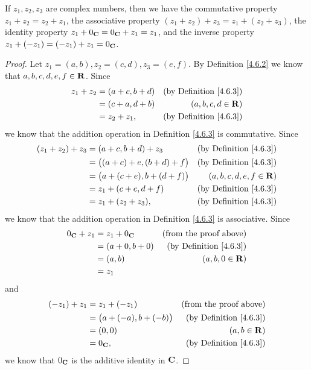 \begin{lemma}\label{4.6.4}
    If \(z_1, z_2, z_3\) are complex numbers, then we have the commutative property \(z_1 + z_2 = z_2 + z_1\), the associative property \((z_1 + z_2) + z_3 = z_1 + (z_2 + z_3)\), the identity property \(z_1 + 0_{\mathbf{C}} = 0_{\mathbf{C}} + z_1 = z_1\), and the inverse property \(z_1 + (-z_1) = (-z_1) + z_1 = 0_{\mathbf{C}}\).
\end{lemma}

\begin{proof}
    Let \(z_1 = (a, b), z_2 = (c, d), z_3 = (e, f)\).
    By Definition \ref{4.6.2} we know that \(a, b, c, d, e, f \in \mathbf{R}\).
    Since
    \begin{align*}
        z_1 + z_2 & = (a + c, b + d) & \text{(by Definition \ref{4.6.3})} \\
                  & = (c + a, d + b) & (a, b, c, d \in \mathbf{R})                \\
                  & = z_2 + z_1,     & \text{(by Definition \ref{4.6.3})}
    \end{align*}
    we know that the addition operation in Definition \ref{4.6.3} is commutative.
    Since
    \begin{align*}
        (z_1 + z_2) + z_3 & = (a + c, b + d) + z_3               & \text{(by Definition \ref{4.6.3})} \\
                          & = \big((a + c) + e, (b + d) + f\big) & \text{(by Definition \ref{4.6.3})} \\
                          & = \big(a + (c + e), b + (d + f)\big) & (a, b, c, d, e, f \in \mathbf{R})          \\
                          & = z_1 + (c + e, d + f)               & \text{(by Definition \ref{4.6.3})} \\
                          & = z_1 + (z_2 + z_3),                 & \text{(by Definition \ref{4.6.3})}
    \end{align*}
    we know that the addition operation in Definition \ref{4.6.3} is associative.
    Since
    \begin{align*}
        0_{\mathbf{C}} + z_1 & = z_1 + 0_{\mathbf{C}}   & \text{(from the proof above)}      \\
                     & = (a + 0, b + 0) & \text{(by Definition \ref{4.6.3})} \\
                     & = (a, b)         & (a, b, 0 \in \mathbf{R})                   \\
                     & = z_1
    \end{align*}
    and
    \begin{align*}
        (-z_1) + z_1 & = z_1 + (-z_1)                 & \text{(from the proof above)}      \\
                     & = \big(a + (-a), b + (-b)\big) & \text{(by Definition \ref{4.6.3})} \\
                     & = (0, 0)                       & (a, b \in \mathbf{R})                      \\
                     & = 0_{\mathbf{C}},                      & \text{(by Definition \ref{4.6.3})}
    \end{align*}
    we know that \(0_{\mathbf{C}}\) is the additive identity in \(\mathbf{C}\).
\end{proof}

